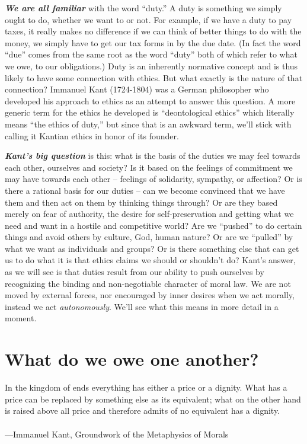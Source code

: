 \documentclass[12pt, openany]{book}
\newenvironment{epigraph}%
{
\begin{flushright}
\begin{minipage}{30em}
\begin{flushright}
\itshape
}%
{
\end{flushright}
\end{minipage}
\end{flushright}
\vspace{1em}
}
\begin{document}
\textbf{\emph{We are all familiar}} with the word ``duty.'' A duty is something we simply ought to do, whether we want to or not. For example, if we have a duty to pay taxes, it really makes no difference if we can think of better things to do with the money, we simply have to get our tax forms in by the due date. (In fact the word ``due'' comes from the same root as the word ``duty'' both of which refer to what we owe, to our obligations.) Duty is an inherently normative concept and is thus likely to have some connection with ethics. But what exactly is the nature of that connection? Immanuel Kant (1724-1804) was a German philosopher who developed his approach to ethics as an attempt to answer this question. A more generic term for the ethics he developed is ``deontological ethics'' which literally means ``the ethics of duty,'' but since that is an awkward term, we'll stick with calling it Kantian ethics in honor of its founder.

\textbf{\emph{Kant's big question}} is this: what is the basis of the duties we may feel towards each other, ourselves and society? Is it based on the feelings of commitment we may have towards each other -- feelings of solidarity, sympathy, or affection? Or is there a rational basis for our duties -- can we become convinced that we have them and then act on them by thinking things through? Or are they based merely on fear of authority, the desire for self-preservation and getting what we need and want in a hostile and competitive world? Are we ``pushed'' to do certain things and avoid others by culture, God, human nature? Or are we ``pulled'' by what we want as individuals and groups? Or is there something else that can get us to do what it is that ethics claims we should or shouldn't do? Kant's answer, as we will see is that duties result from our ability to push ourselves by recognizing the binding and non-negotiable character of moral law. We are not moved by external forces, nor encouraged by inner desires when we act morally, instead we act \emph{autonomously}. We'll see what this means in more detail in a moment.

\hypertarget{what-do-we-owe-one-another}{%
\section{What do we owe one another?}\label{what-do-we-owe-one-another}}

\begin{epigraph}

In the kingdom of ends everything has either a price or a dignity. What has a price can be replaced by something else as its equivalent; what on the other hand is raised above all price and therefore admits of no equivalent has a dignity.\\
~\\
---Immanuel Kant, Groundwork of the Metaphysics of Morals

\end{epigraph}
\end{document}
